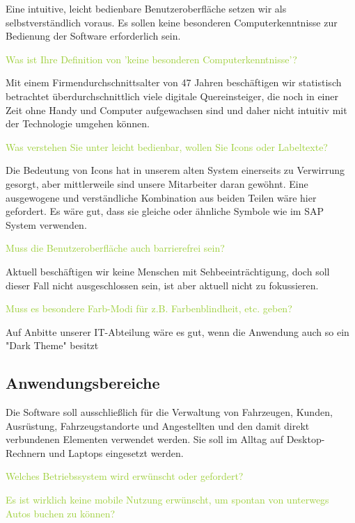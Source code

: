 Eine intuitive, leicht bedienbare Benutzeroberfläche setzen wir als selbstverständlich voraus. 
Es sollen keine besonderen Computerkenntnisse zur Bedienung der Software erforderlich sein.  

\textcolor{YellowGreen}{Was ist Ihre Definition von 'keine besonderen Computerkenntnisse'?}

\textcolor{NavyBlue}{Mit einem Firmendurchschnittsalter von 47 Jahren beschäftigen wir statistisch betrachtet überdurchschnittlich viele digitale Quereinsteiger, die noch in einer Zeit ohne Handy und Computer aufgewachsen sind und daher nicht intuitiv mit der Technologie umgehen können. }

\textcolor{YellowGreen}{Was verstehen Sie unter leicht bedienbar, wollen Sie Icons oder Labeltexte?}

\textcolor{NavyBlue}{Die Bedeutung von Icons hat in unserem alten System einerseits zu Verwirrung gesorgt, aber mittlerweile sind unsere Mitarbeiter daran gewöhnt. Eine ausgewogene und verständliche Kombination aus beiden Teilen wäre hier gefordert. Es wäre gut, dass sie gleiche oder ähnliche Symbole wie im SAP System verwenden.}

\textcolor{YellowGreen}{Muss die Benutzeroberfläche auch barrierefrei sein?}

\textcolor{NavyBlue}{Aktuell beschäftigen wir keine Menschen mit Sehbeeinträchtigung, doch soll dieser Fall nicht ausgeschlossen sein, ist aber aktuell nicht zu fokussieren.}

\textcolor{YellowGreen}{Muss es besondere Farb-Modi für z.B. Farbenblindheit, etc. geben?}

\textcolor{NavyBlue}{Auf Anbitte unserer IT-Abteilung wäre es gut, wenn die Anwendung auch so ein "Dark Theme" besitzt}


\subsection{Anwendungsbereiche}

Die Software soll ausschließlich für die Verwaltung von Fahrzeugen, Kunden, Ausrüstung, Fahrzeugstandorte und Angestellten und den damit direkt verbundenen Elementen verwendet werden. 
Sie soll im Alltag auf Desktop-Rechnern und Laptops eingesetzt werden.  

\textcolor{YellowGreen}{Welches Betriebssystem wird erwünscht oder gefordert?}

\textcolor{YellowGreen}{Es ist wirklich keine mobile Nutzung erwünscht, um spontan von unterwegs Autos buchen zu können?}

